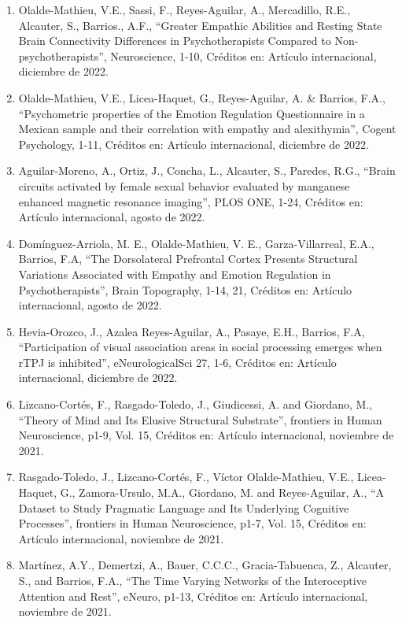 \begin{enumerate}
\item Olalde-Mathieu, V.E., Sassi, F., Reyes-Aguilar, A., Mercadillo, R.E., Alcauter, S., Barrios., A.F., 
“Greater Empathic Abilities and Resting State Brain Connectivity Differences in Psychotherapists Compared to 
Non-psychotherapists”, Neuroscience, 1-10, Créditos en: Artículo internacional, diciembre de 2022.

\item Olalde-Mathieu, V.E., Licea-Haquet, G., Reyes-Aguilar, A. \& Barrios, F.A., “Psychometric properties of the Emotion 
Regulation Questionnaire in a Mexican sample and their correlation with empathy and alexithymia”, Cogent Psychology, 1-11, 
Créditos en: Artículo internacional, diciembre de 2022.

\item Aguilar-Moreno, A., Ortiz, J., Concha, L., Alcauter, S., Paredes, R.G., “Brain circuits activated by female sexual 
behavior evaluated by manganese enhanced magnetic resonance imaging”, PLOS ONE, 1-24, Créditos en: Artículo internacional, 
agosto de 2022.

\item Domínguez-Arriola, M. E., Olalde-Mathieu, V. E., Garza-Villarreal, E.A., Barrios, F.A, “The Dorsolateral Prefrontal 
Cortex Presents Structural Variations Associated with Empathy and Emotion Regulation in Psychotherapists”, Brain 
Topography, 1-14, 21, Créditos en: Artículo internacional, agosto de 2022.

\item Hevia-Orozco, J., Azalea Reyes-Aguilar, A., Pasaye, E.H., Barrios, F.A, “Participation of visual association areas in 
social processing emerges when rTPJ is inhibited”, eNeurologicalSci 27, 1-6, Créditos en: Artículo internacional, diciembre 
de 2022.

\item Lizcano-Cortés, F., Rasgado-Toledo, J., Giudicessi, A. and Giordano, M., “Theory of Mind and Its Elusive Structural 
Substrate”, frontiers in Human Neuroscience, p1-9, Vol. 15, Créditos en: Artículo internacional, noviembre de 2021.

\item Rasgado-Toledo, J., Lizcano-Cortés, F., Víctor Olalde-Mathieu, V.E., Licea-Haquet, G., Zamora-Ursulo, M.A., Giordano, 
M. and Reyes-Aguilar, A., “A Dataset to Study Pragmatic Language and Its Underlying Cognitive Processes”, frontiers in 
Human Neuroscience, p1-7, Vol. 15, Créditos en: Artículo internacional, noviembre de 2021.

\item Martínez, A.Y., Demertzi, A., Bauer, C.C.C., Gracia-Tabuenca, Z., Alcauter, S., and Barrios, F.A., “The Time Varying 
Networks of the Interoceptive Attention and Rest”, eNeuro, p1-13, Créditos en: Artículo internacional, noviembre de 2021.


\end{enumerate}
